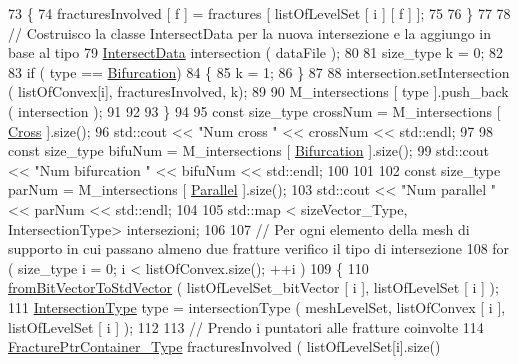 \begin{DoxyCode}
73             \{
74                  fracturesInvolved [ f ] = fractures [ listOfLevelSet [ i ] [ f ] ];
75 
76             \}
77 
78             \textcolor{comment}{// Costruisco la classe IntersectData per la nuova intersezione e la aggiungo in base al tipo}
79             \hyperlink{classIntersectData}{IntersectData} intersection ( dataFile );
80             
81             size\_type k = 0;
82             
83             \textcolor{keywordflow}{if} ( type == \hyperlink{classFractureIntersect_a9a4e4a784fa4c8e359767ed543f89dc5a4d466b3d3de0af7e18732b6f765bb1af}{Bifurcation})
84             \{
85                 k = 1;
86             \}
87             
88             intersection.setIntersection ( listOfConvex[i], fracturesInvolved, k);
89 
90             M\_intersections [ type ].push\_back ( intersection );
91 
92 
93         \}
94 
95         \textcolor{keyword}{const} size\_type crossNum = M\_intersections [ \hyperlink{classFractureIntersect_a9a4e4a784fa4c8e359767ed543f89dc5a743fef1af81c0e61412fafb9438b380e}{Cross} ].size();
96         std::cout << \textcolor{stringliteral}{"Num cross "} << crossNum << std::endl;
97 
98         \textcolor{keyword}{const} size\_type bifuNum = M\_intersections [ \hyperlink{classFractureIntersect_a9a4e4a784fa4c8e359767ed543f89dc5a4d466b3d3de0af7e18732b6f765bb1af}{Bifurcation} ].size();
99         std::cout << \textcolor{stringliteral}{"Num bifurcation "} << bifuNum << std::endl;
100 
101 
102         \textcolor{keyword}{const} size\_type parNum = M\_intersections [ \hyperlink{classFractureIntersect_a9a4e4a784fa4c8e359767ed543f89dc5ad91760e1506b52a828bc401490f7c92b}{Parallel} ].size();
103         std::cout << \textcolor{stringliteral}{"Num parallel "} << parNum << std::endl;
104 
105         std::map < sizeVector\_Type, IntersectionType> intersezioni;
106 
107         \textcolor{comment}{// Per ogni elemento della mesh di supporto in cui passano almeno due fratture verifico il tipo di
       intersezione}
108         \textcolor{keywordflow}{for} ( size\_type i = 0; i < listOfConvex.size(); ++i )
109         \{
110            \hyperlink{UsefulFunctions_8h_a0ea0b08a12a1e6a94718cf3bcd60edeb}{fromBitVectorToStdVector} ( listOfLevelSet\_bitVector [ i ], 
      listOfLevelSet [ i ] );
111            \hyperlink{classFractureIntersect_a9a4e4a784fa4c8e359767ed543f89dc5}{IntersectionType} type = intersectionType ( meshLevelSet, listOfConvex [ i ], 
      listOfLevelSet [ i ] );
112 
113            \textcolor{comment}{// Prendo i puntatori alle fratture coinvolte}
114            \hyperlink{FractureHandler_8h_a2f0b57e18ecf89912d7de0c87158009e}{FracturePtrContainer\_Type} fracturesInvolved ( listOfLevelSet[i].size() 

\end{DoxyCode}
